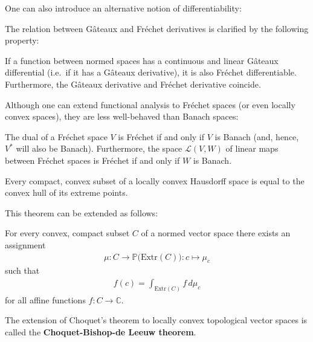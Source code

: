    One can also introduce an alternative notion of differentiability:

    The relation between G\^ateaux and Fr\'echet derivatives is clarified by the following property:
    \begin{property}
        If a function between normed spaces has a continuous and linear G\^ateaux differential (i.e.~if it has a G\^ateaux derivative), it is also Fr\'echet differentiable. Furthermore, the G\^ateaux derivative and Fr\'echet derivative coincide.
    \end{property}

    Although one can extend functional analysis to Fr\'echet spaces (or even locally convex spaces), they are less well-behaved than Banach spaces:
    \begin{property}
        The dual of a Fr\'echet space $V$ is Fr\'echet if and only if $V$ is Banach (and, hence, $V^*$ will also be Banach). Furthermore, the space $\mathcal{L}(V,W)$ of linear maps between Fr\'echet spaces is Fr\'echet if and only if $W$ is Banach.
    \end{property}

    \begin{theorem}\label{functional:krein_milman}
        Every compact, convex subset of a locally convex Hausdorff space is equal to the convex hull of its extreme points.
    \end{theorem}
    This theorem can be extended as follows:
    \begin{theorem}[Choquet]\label{functional:choquet}
        For every convex, compact subset $C$ of a normed vector space there exists an assignment
        \begin{gather}
            \mu:C\rightarrow\mathbb{P}\big(\mathrm{Extr}(C)\big):c\mapsto\mu_c
        \end{gather}
        such that
        \begin{gather}
            f(c) = \int_{\mathrm{Extr}(C)}f\,d\mu_c
        \end{gather}
        for all affine functions $f:C\rightarrow\mathbb{C}$.
    \end{theorem}
    \begin{remark}
        The extension of Choquet's theorem to locally convex topological vector spaces is called the \textbf{Choquet-Bishop-de Leeuw theorem}.
    \end{remark}


